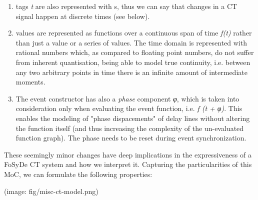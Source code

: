                  \begin{enumerate}
                 \item 
                 tags \emph{t} are also represented with
 s, thus we can say that changes in a
 CT signal happen at discrete times (see below).\par
                 
                 \item 
                 values are represented as functions over a continuous span of
 time \emph{f(t)} rather than just a value or a series of values. The
 time domain is represented with rational numbers which, as
 compared to floating point numbers, do not suffer from inherent
 quantisation, being able to model true continuity, i.e. between
 any two arbitrary points in time there is an infinite amount of
 intermediate moments.\par
                 
                 \item 
                 The event constructor has also a \emph{phase} component \emph{φ},
 which is taken into consideration only when evaluating the event
 function, i.e. \emph{f (t + φ)}. This enables the modeling of
 "phase dispacements" of delay lines without altering the function
 itself (and thus increasing the complexity of the un-evaluated
 function graph). The phase needs to be reset during event
 synchronization.\par
                 
                 \end{enumerate}
                 These seemingly minor changes have deep implications in the
 expressiveness of a FoSyDe CT system and how we interpret
 it. Capturing the particularities of this MoC, we can formulate
 the following properties:\par
                 (image: fig/misc-ct-model.png)\par
